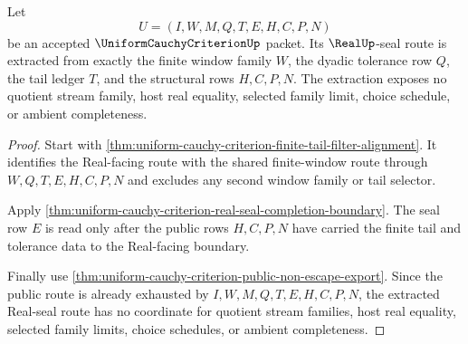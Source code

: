 \begin{theorem}
\label{thm:uniform-cauchy-criterion-finite-window-real-seal-extraction}
Let
$$
U=(I,W,M,Q,T,E,H,C,P,N)
$$
be an accepted $\UniformCauchyCriterionUp$ packet. Its $\RealUp$-seal route is extracted from exactly the finite window family $W$, the dyadic tolerance row $Q$, the tail ledger $T$, and the structural rows $H,C,P,N$. The extraction exposes no quotient stream family, host real equality, selected family limit, choice schedule, or ambient completeness.
\end{theorem}
\begin{proof}
Start with \autoref{thm:uniform-cauchy-criterion-finite-tail-filter-alignment}. It identifies the Real-facing route with the shared finite-window route through $W,Q,T,E,H,C,P,N$ and excludes any second window family or tail selector.

Apply \autoref{thm:uniform-cauchy-criterion-real-seal-completion-boundary}. The seal row $E$ is read only after the public rows $H,C,P,N$ have carried the finite tail and tolerance data to the Real-facing boundary.

Finally use \autoref{thm:uniform-cauchy-criterion-public-non-escape-export}. Since the public route is already exhausted by $I,W,M,Q,T,E,H,C,P,N$, the extracted Real-seal route has no coordinate for quotient stream families, host real equality, selected family limits, choice schedules, or ambient completeness.
\end{proof}






